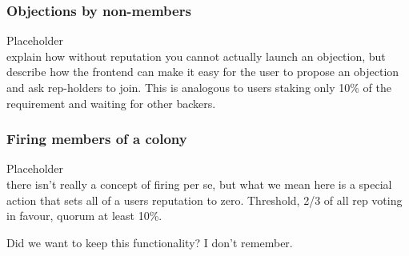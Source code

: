 \subsubsection{Objections by non-members}
%
Placeholder\\
explain how without reputation you cannot actually launch an objection, but describe how the frontend can make it easy for the user to propose an objection and ask rep-holders to join. This is analogous to users staking only 10\% of the requirement and waiting for other backers.
%

\subsubsection{Firing members of a colony}

%
Placeholder\\
there isn't really a concept of firing per se, but what we mean here is a special action that sets all of a users reputation to zero.
Threshold, 2/3 of all rep voting in favour, quorum at least 10\%. 
%

Did we want to keep this functionality? I don't remember.

